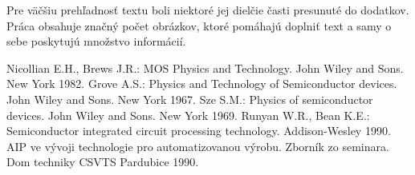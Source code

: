 \par Pre väčšiu prehľadnosť textu boli niektoré jej dielčie časti
presunuté do dodatkov.  Práca obsahuje značný počet obrázkov, ktoré
pomáhajú doplniť text a samy o sebe poskytujú množstvo informácií.


\begin{thebibliography}{}
Nicollian E.H., Brews J.R.: MOS Physics  and  Technology. John Wiley and Sons. New York 1982.
Grove A.S.: Physics and Technology of Semiconductor devices. John Wiley and Sons. New York 1967.
Sze S.M.: Physics of semiconductor devices. John Wiley and Sons. New York 1969.
Runyan W.R., Bean K.E.: Semiconductor integrated circuit  processing technology. Addison-Wesley 1990.
AIP ve vývoji technologie pro automatizovanou výrobu. Zborník zo seminara. Dom techniky CSVTS Pardubice 1990.
\end{thebibliography}
